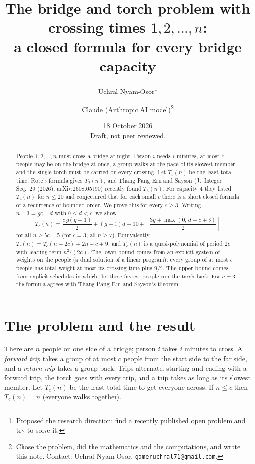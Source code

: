 \documentclass[11pt]{article}
\title{The bridge and torch problem with crossing times $1,2,\dots,n$:\\ a closed formula for every bridge capacity}
\author{Uchral Nyam-Osor\thanks{Proposed the research direction: find a recently published open problem and try to solve it.} \and Claude (Anthropic AI model)\thanks{Chose the problem, did the mathematics and the computations, and wrote this note. Contact: Uchral Nyam-Osor, \texttt{gameruchral71@gmail.com}.}}
\date{18 October 2026\\ \small Draft, not peer reviewed.}
\theoremstyle{remark}
\newcommand{\ceil}[1]{\left\lceil #1\right\rceil}
\begin{document}
\maketitle

\begin{abstract}
People $1,2,\dots,n$ must cross a bridge at night. Person $i$ needs $i$ minutes, at most $c$ people may be on the bridge at once, a group walks at the pace of its slowest member, and the single torch must be carried on every crossing. Let $T_c(n)$ be the least total time. Rote's formula gives $T_2(n)$, and Thang Pang Ern and Sayson (J.\ Integer Seq.\ 29 (2026), arXiv:2608.05190) recently found $T_3(n)$. For capacity $4$ they listed $T_4(n)$ for $n\le 20$ and conjectured that for each small $c$ there is a short closed formula or a recurrence of bounded order. We prove this for every $c\ge 3$. Writing $n+3=gc+d$ with $0\le d<c$, we show
\[
T_c(n)=\frac{c\,g(g+1)}{2}+(g+1)d-10+\ceil{\frac{3g+\max(0,\,d-c+3)}{2}}
\]
for all $n\ge 5c-5$ (for $c=3$, all $n\ge 7$). Equivalently, $T_c(n)=T_c(n-2c)+2n-c+9$, and $T_c(n)$ is a quasi-polynomial of period $2c$ with leading term $n^2/(2c)$. The lower bound comes from an explicit system of weights on the people (a dual solution of a linear program): every group of at most $c$ people has total weight at most its crossing time plus $9/2$. The upper bound comes from explicit schedules in which the three fastest people run the torch back. For $c=3$ the formula agrees with Thang Pang Ern and Sayson's theorem.
\end{abstract}

\section{The problem and the result}

There are $n$ people on one side of a bridge; person $i$ takes $i$ minutes to cross. A \emph{forward trip} takes a group of at most $c$ people from the start side to the far side, and a \emph{return trip} takes a group back. Trips alternate, starting and ending with a forward trip, the torch goes with every trip, and a trip takes as long as its slowest member. Let $T_c(n)$ be the least total time to get everyone across. If $n\le c$ then $T_c(n)=n$ (everyone walks together).
\end{document}
